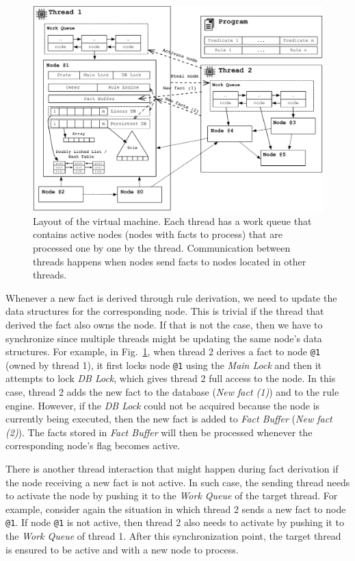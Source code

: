 \begin{figure}[t]
\centering
\includegraphics[width=\textwidth]{figures/implementation/vm_overview.pdf}
\caption{Layout of the virtual machine. Each thread has a work queue that
   contains active nodes (nodes with facts to process) that are processed one
   by one by the thread. Communication between threads happens when nodes
   send facts to nodes located in other threads.}
\label{fig:implementation:vm_overview}
\end{figure}

Whenever a new fact is derived through rule derivation, we need to update the
data structures for the corresponding node. This is trivial if the thread that
derived the fact also owns the node. If that is not the case, then we have to
synchronize since multiple threads might be updating the same node's data
structures. For example, in Fig.~\ref{fig:implementation:vm_overview}, when
thread 2 derives a fact to node \texttt{@1} (owned by thread 1), it first locks
node \texttt{@1} using the \emph{Main Lock} and then it attempts to lock
\emph{DB Lock}, which gives thread 2 full access to the node. In this case,
thread 2 adds the new fact to the database (\emph{New fact (1)}) and to the rule
engine. However, if the \emph{DB Lock} could not be acquired because the node
 is currently being executed, then the new fact is added to \emph{Fact
Buffer} (\emph{New fact (2)}). The facts stored in \emph{Fact Buffer} will then
be processed whenever the corresponding node's flag becomes active.

There is another thread interaction that might happen during fact derivation if
the node receiving a new fact is not active. In such case, the sending thread
needs to activate the node by pushing it to the \emph{Work Queue} of the target
thread. For example, consider again the situation in which thread 2 sends a new
fact to node \texttt{@1}. If node \texttt{@1} is not active, then thread 2 also
needs to activate  by pushing it to the \emph{Work Queue} of thread 1.
After this synchronization point, the target thread is ensured to be active and
with a new node to process.

